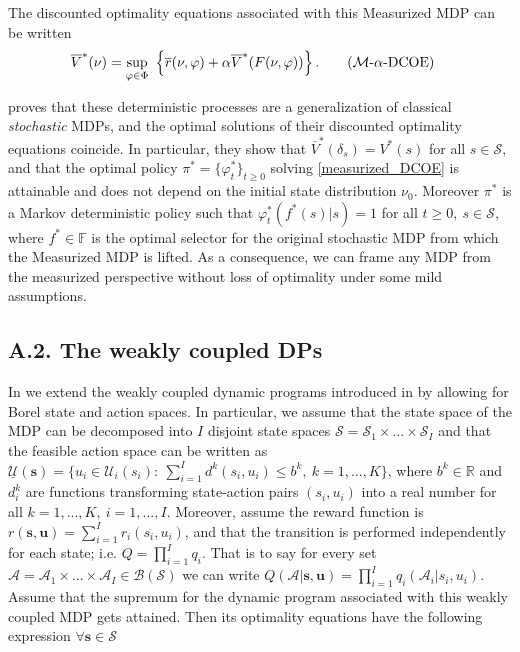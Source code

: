 \documentclass[12pt,a4paper]{article}
\newcommand{\V}{\overline{V}}
\newcommand{\bu}{\mathbf{u}}
\newcommand{\bs}{\mathbf{s}}
\newcommand{\mA}{\mathcal{A}}
\newcommand{\mS}{\mathcal{S}}
\newcommand{\mU}{\mathcal{U}}
\newcommand{\mM}{\mathcal{M}}
\newcommand{\mBS}{\mathcal{B}(\mathcal{S})}
\newcommand{\ovr}{\overline{r}}
\begin{document}
		The discounted optimality equations associated with this Measurized MDP can be written
		\begin{align}
			\overline{V}^*(\nu)&=\sup_{\varphi \in \Phi} \ \left\{ \ovr(\nu,\varphi) + \alpha   \overline{V}^*(F(\nu,\varphi))\right\}. \label{measurized_DCOE} \tag{$\mM$-$\alpha$-DCOE}
		\end{align}
		
		\cite{measurized} proves that these deterministic processes are a generalization of classical {\it stochastic} MDPs, and the optimal solutions of their discounted optimality equations coincide. In particular, they show that $\V^*(\delta_s)=V^*(s)$ for all $s \in \mS$, and that the optimal policy $\pi^*=\{\varphi_t^*\}_{t \geq 0}$ solving \eqref{measurized_DCOE} is attainable and does not depend on the initial state distribution $\nu_0$. Moreover $\pi^*$ is a Markov deterministic policy such that $\varphi_t^*(f^*(s)|s)=1$ for all  $t \geq 0, \ s \in \mS$, where $f^* \in \mathbb{F}$ is the optimal selector for the original stochastic MDP from which the Measurized MDP is lifted. As a consequence, we can frame any MDP from the measurized perspective without loss of optimality under some mild assumptions.  
		
		
		
		
		
		\subsection*{ A.2. The weakly coupled DPs}
		
		In \cite{measurizedWMDP} we extend the weakly coupled dynamic programs introduced in \cite{adelman_weakly} by allowing for Borel state and action spaces. In  particular, we assume that the state space of the MDP can be decomposed into $I$ disjoint state spaces $\mS=\mS_1 \times ... \times \mS_I$ and that the feasible action space can be written as  $\underline{\mU}(\bs)=\{ u_i \in \mU_i(s_i): \ \sum_{i=1}^I d^k(s_i,u_i) \leq b^k, \ k=1,...,K  \}$, where $b^k \in \mathbb{R}$ and $d^k_i$ are functions transforming state-action pairs $(s_i,u_i)$ into a real number for all $k=1,...,K, \ i=1,...,I$. Moreover, assume the reward function is $r(\bs,\bu)=\sum_{i=1}^I r_i(s_i,u_i)$, and that the transition is performed independently for each state; i.e. $Q=\prod_{i=1}^I q_i$. That is to say  for every set $\mA=\mA_1\times...\times \mA_I \in \mBS$ we can write $Q(\mA|\bs,\bu)=\prod_{i=1}^I q_i(\mA_i|s_i,u_i)$. Assume that the supremum for the dynamic program associated with this weakly coupled MDP gets attained. Then its optimality equations have the following expression $\forall \bs \in \mS$
		
\end{document}
